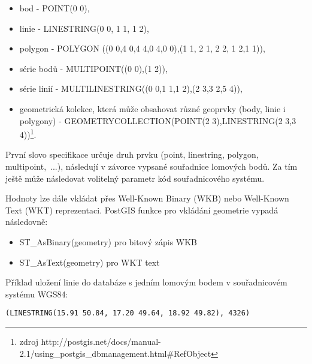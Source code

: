         \begin{itemize}
          \item bod - POINT(0 0),
          \item linie - LINESTRING(0 0, 1 1, 1 2),
          \item polygon - POLYGON ((0 0,4 0,4 4,0 4,0 0),(1 1, 2 1, 2 2, 1 2,1 1)),
          \item série bodů - MULTIPOINT((0 0),(1 2)),
          \item série linií - MULTILINESTRING((0 0,1 1,1 2),(2 3,3 2,5 4)),
          \item geometrická kolekce, která může obsahovat různé geoprvky (body, linie i polygony) - GEOMETRYCOLLECTION(POINT(2 3),LINESTRING(2 3,3 4))\footnote{zdroj http://postgis.net/docs/manual-2.1/using\_postgis\_dbmanagement.html\#RefObject}.
        \end{itemize}

První slovo specifikace určuje druh prvku (point, linestring, polygon, multipoint,~...), následují v závorce vypsané souřadnice lomových bodů. Za tím ještě může následovat volitelný parametr kód souřadnicového systému.

Hodnoty lze dále vkládat přes Well-Known Binary (WKB) nebo Well-Known Text (WKT) reprezentaci. PostGIS funkce pro vkládání geometrie vypadá následovně:

        \begin{itemize}
          \item ST\_AsBinary(geometry) pro bitový zápis WKB
          \item ST\_AsText(geometry) pro WKT text
        \end{itemize}

        Příklad uložení linie do databáze s jedním lomovým bodem v souřadnicovém systému WGS84:

        \texttt{(LINESTRING(15.91 50.84, 17.20 49.64, 18.92 49.82), 4326)}
